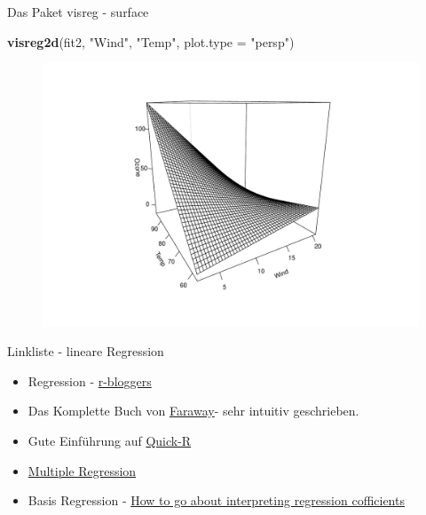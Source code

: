 \documentclass[ignorenonframetext,]{beamer}
\newenvironment{Shaded}{}{}
\newcommand{\KeywordTok}[1]{\textcolor[rgb]{0.00,0.44,0.13}{\textbf{{#1}}}}
\newcommand{\DataTypeTok}[1]{\textcolor[rgb]{0.56,0.13,0.00}{{#1}}}
\newcommand{\StringTok}[1]{\textcolor[rgb]{0.25,0.44,0.63}{{#1}}}
\newcommand{\NormalTok}[1]{{#1}}
\begin{document}
\begin{frame}[fragile]{Das Paket visreg - surface}

\begin{Shaded}
\begin{Highlighting}[]
\KeywordTok{visreg2d}\NormalTok{(fit2, }\StringTok{"Wind"}\NormalTok{, }\StringTok{"Temp"}\NormalTok{, }\DataTypeTok{plot.type =} \StringTok{"persp"}\NormalTok{)}
\end{Highlighting}
\end{Shaded}

\begin{figure}[htbp]
\centering
\includegraphics{RSocialScience2_files/figure-beamer/unnamed-chunk-89-1.pdf}
\caption{}
\end{figure}

\end{frame}

\begin{frame}{Linkliste - lineare Regression}

\begin{itemize}
\item
  Regression -
  \href{http://www.r-bloggers.com/r-tutorial-series-simple-linear-regression/}{r-bloggers}
\item
  Das Komplette Buch von
  \href{http://cran.r-project.org/doc/contrib/Faraway-PRA.pdf}{Faraway}-
  sehr intuitiv geschrieben.
\item
  Gute Einführung auf
  \href{http://www.statmethods.net/stats/regression.html}{Quick-R}
\item
  \href{https://www.r-bloggers.com/multiple-regression-part-1/}{Multiple
  Regression}
\item
  Basis Regression -
  \href{https://www.r-bloggers.com/how-to-go-about-interpreting-regression-cofficients/}{How
  to go about interpreting regression cofficients}
\end{itemize}

\end{frame}
\end{document}
